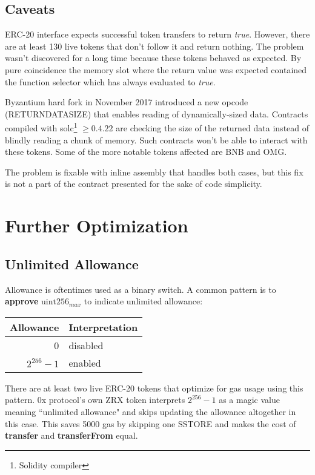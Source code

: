 \documentclass[12pt]{article}
\begin{document}
\subsection{Caveats}

ERC-20 interface expects successful token transfers to return \textit{true}.
However, there are at least 130 live tokens that don't follow it and return nothing.
The problem wasn't discovered for a long time because these tokens behaved as expected\cite{cremer}.
By pure coincidence the memory slot where the return value was expected contained the function selector which has always evaluated to \textit{true}.

Byzantium hard fork in November 2017 introduced a new opcode (RETURNDATASIZE) that enables reading of dynamically-sized data.
Contracts compiled with solc\footnote{Solidity compiler} $\geq 0.4.22$ are checking the size of the returned data instead of blindly reading a chunk of memory.
Such contracts won't be able to interact with these tokens.
Some of the more notable tokens affected are BNB and OMG.

The problem is fixable with inline assembly that handles both cases, but this fix is not a part of the contract presented for the sake of code simplicity.


\section{Further Optimization}

\subsection{Unlimited Allowance}
Allowance is oftentimes used as a binary switch.
A common pattern is to \textbf{approve} $\text{uint256}_{max}$ to indicate unlimited allowance:

\begin{center}	
\begin{tabular}{r l}
	Allowance & Interpretation \\ \hline
	0 & disabled \\
	$2^{256}-1$ & enabled
\end{tabular}
\end{center}

There are at least two live ERC-20 tokens that optimize for gas usage using this pattern.
0x protocol's own ZRX token interprets $2^{256}-1$ as a magic value meaning ``unlimited allowance" and skips updating the allowance altogether in this case\cite{zrx-unlimited}.
This saves 5000 gas by skipping one SSTORE and makes the cost of \textbf{transfer} and \textbf{transferFrom} equal.
\end{document}
